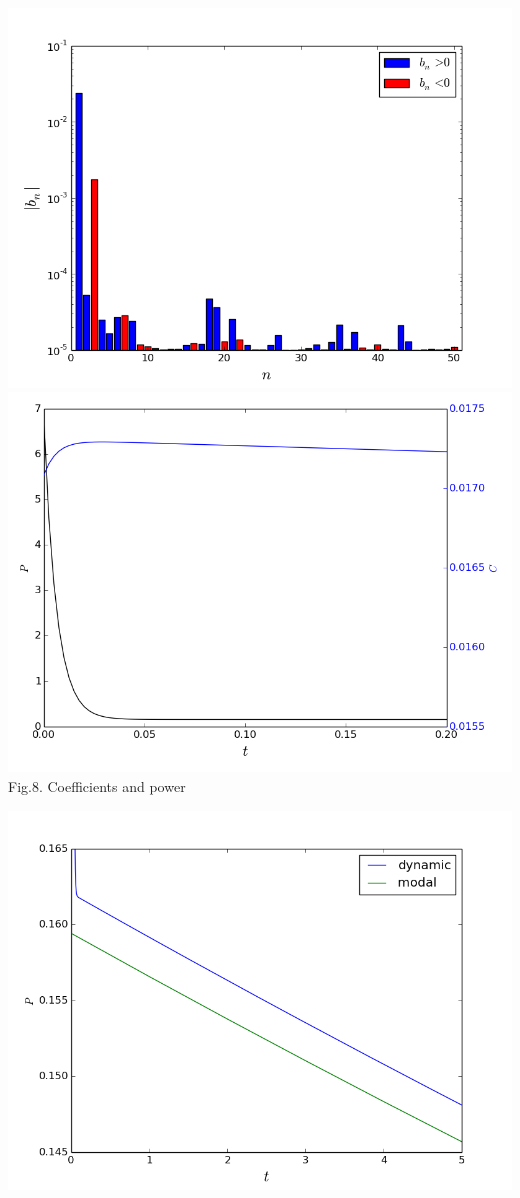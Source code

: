 \documentclass[a1paper,fontscale=0.6]{poster}
\begin{document}
\begin{poster}
{\begin{minipage}{0.5\textwidth}
\begin{center}
\includegraphics[width=0.75\linewidth]{scmm/12.png}
\includegraphics[width=0.75\linewidth]{scmm/14.png}\\
\vspace{-0.5em}
\footnotesize{Fig.8. Coefficients and power}
\end{center}
\end{minipage}
\begin{minipage}{0.5\textwidth}
\begin{center}
\includegraphics[width=0.75\linewidth]{scmm/17.png}

\end{center}
\end{minipage}}
\end{poster}
\end{document}
